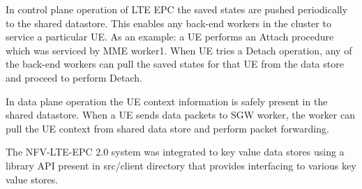 \documentclass[hidelinks]{report}
\begin{document}
\par In control plane operation of LTE EPC the saved states are pushed periodically to the shared datastore. This enables any back-end workers in the cluster to service a particular UE. As an example: a UE performs an Attach procedure which was serviced by MME worker1. When UE tries a Detach operation, any of the back-end workers can pull the saved states for that UE from the data store and proceed to perform Detach.
\par In data plane operation the UE context information is safely present in the shared datastore. When a UE sends data packets to SGW worker, the worker can pull the UE context from shared data store and perform packet forwarding.

\par The NFV-LTE-EPC 2.0 system was integrated to key value data stores using a library API present in src/client directory that provides interfacing to various key value stores.
\end{document}
